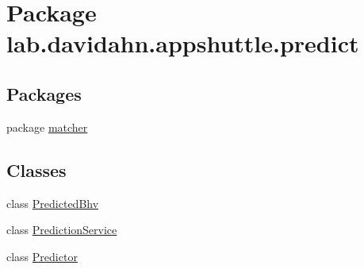 \hypertarget{namespacelab_1_1davidahn_1_1appshuttle_1_1predict}{\section{\-Package lab.\-davidahn.\-appshuttle.\-predict}
\label{namespacelab_1_1davidahn_1_1appshuttle_1_1predict}
}
\subsection*{\-Packages}
\begin{DoxyCompactItemize}
\item 
package \hyperlink{namespacelab_1_1davidahn_1_1appshuttle_1_1predict_1_1matcher}{matcher}
\end{DoxyCompactItemize}
\subsection*{\-Classes}
\begin{DoxyCompactItemize}
\item 
class \hyperlink{classlab_1_1davidahn_1_1appshuttle_1_1predict_1_1_predicted_bhv}{\-Predicted\-Bhv}
\item 
class \hyperlink{classlab_1_1davidahn_1_1appshuttle_1_1predict_1_1_prediction_service}{\-Prediction\-Service}
\item 
class \hyperlink{classlab_1_1davidahn_1_1appshuttle_1_1predict_1_1_predictor}{\-Predictor}
\end{DoxyCompactItemize}
